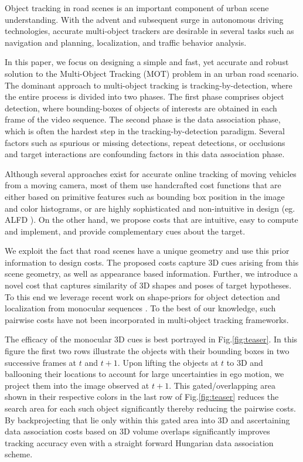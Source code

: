 \documentclass[letterpaper, 10 pt, conference]{ieeeconf}
\begin{document}
Object tracking in road scenes is an important component of urban scene understanding. With the advent and subsequent surge in autonomous driving technologies, accurate multi-object trackers are desirable in several tasks such as navigation and planning, localization, and traffic behavior analysis.

In this paper, we focus on designing a simple and fast, yet accurate and robust solution to the Multi-Object Tracking (MOT) problem in an urban road scenario. The dominant approach to multi-object tracking is tracking-by-detection, where the entire process is divided into two phases. The first phase comprises object detection, where bounding-boxes of objects of interests are obtained in each frame of the video sequence. The second phase is the data association phase, which is often the hardest step in the tracking-by-detection paradigm. Several factors such as spurious or missing detections, repeat detections, or occlusions and target interactions are confounding factors in this data association phase. 

Although several approaches \cite{DeepNetworkFlow,eccv2016,ijcv2017,greedyTracker,survey} exist for accurate online tracking of moving vehicles from a moving camera, most of them \cite{NOMT,eccv2016} use handcrafted cost functions that are either based on primitive features such as bounding box position in the image and color histograms, or are highly sophisticated and non-intuitive in design (eg. ALFD \cite{NOMT}). On the other hand, we propose costs that are intuitive, easy to compute and implement, and provide complementary cues about the target.

We exploit the fact that road scenes have a unique geometry and use this prior information to design costs. The proposed costs capture 3D cues arising from this scene geometry, as well as appearance based information. Further, we introduce a novel cost that captures similarity of 3D shapes and poses of target hypotheses. To this end we leverage recent work on shape-priors for object detection and localization from monocular sequences \cite{KM_ICRA,KM_IROS}. To the best of our knowledge, such pairwise costs have not been incorporated in multi-object tracking frameworks.

The efficacy of the monocular 3D cues is best portrayed in Fig.\ref{fig:teaser}. In this figure the first two rows illustrate the objects with their bounding boxes in two successive frames at $t$ and $t+1$. Upon lifting the objects at $t$ to 3D and ballooning their locations to account for large uncertainties in ego motion, we project them into the image observed at $t+1$. This gated/overlapping area shown in their respective colors in the last row of Fig.\ref{fig:teaser} reduces the search area for each such object significantly thereby reducing the pairwise costs. By backprojecting that lie only within this gated area into 3D and ascertaining data association costs based on 3D volume overlaps significantly improves tracking accuracy even with a straight forward Hungarian data association scheme.
\end{document}
